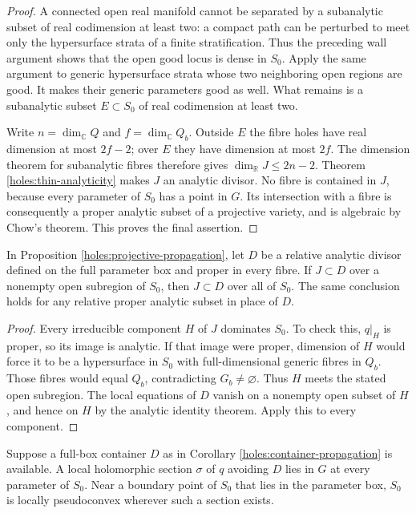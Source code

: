 \begin{proof}
A connected open real manifold cannot be separated by a
subanalytic subset of real codimension at least two: a compact
path can be perturbed to meet only the hypersurface strata of
a finite stratification. Thus the preceding wall argument shows
that the open good locus is dense in $S_0$. Apply the same
argument to generic hypersurface strata whose two neighboring
open regions are good. It makes their generic parameters good
as well. What remains is a subanalytic subset $E\subset S_0$
of real codimension at least two.

Write $n=\dim_{\mathbb C}Q$ and $f=\dim_{\mathbb C}Q_b$.
Outside $E$ the fibre holes have real dimension at most $2f-2$;
over $E$ they have dimension at most $2f$. The dimension theorem
for subanalytic fibres therefore gives $\dim_{\mathbb R}J\leq2n-2$.
Theorem \ref{holes:thin-analyticity} makes $J$ an analytic divisor.
No fibre is contained in $J$, because every parameter of $S_0$
has a point in $G$. Its intersection with a fibre is consequently
a proper analytic subset of a projective variety, and is algebraic
by Chow's theorem. This proves the final assertion.
\end{proof}

\begin{corollary}
\label{holes:container-propagation}
In Proposition \ref{holes:projective-propagation}, let $D$ be a
relative analytic divisor defined on the full parameter box and
proper in every fibre. If $J\subset D$ over a nonempty open
subregion of $S_0$, then $J\subset D$ over all of $S_0$.
The same conclusion holds for any relative proper analytic
subset in place of $D$.
\end{corollary}

\begin{proof}
Every irreducible component $H$ of $J$ dominates $S_0$. To check
this, $q|_H$ is proper, so its image is analytic. If that image
were proper, dimension of $H$ would force it to be a hypersurface
in $S_0$ with full-dimensional generic fibres in $Q_b$. Those
fibres would equal $Q_b$, contradicting $G_b\ne\varnothing$.
Thus $H$ meets the stated open subregion. The local equations of
$D$ vanish on a nonempty open subset of $H$, and hence on $H$
by the analytic identity theorem. Apply this to every component.
\end{proof}

\begin{corollary}
\label{holes:section-test}
Suppose a full-box container $D$ as in Corollary
\ref{holes:container-propagation} is available. A local holomorphic
section $\sigma$ of $q$ avoiding $D$ lies in $G$ at every parameter
of $S_0$. Near a boundary point of $S_0$ that lies in the parameter
box, $S_0$ is locally pseudoconvex wherever such a section exists.
\end{corollary}

